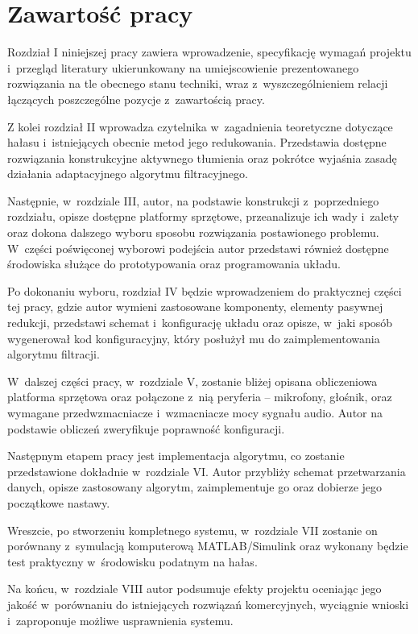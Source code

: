 \section{Zawartość pracy}
\label{sec:zawartoscPracy}
Rozdział I niniejszej pracy zawiera wprowadzenie, specyfikację wymagań projektu i~przegląd literatury ukierunkowany na umiejscowienie prezentowanego rozwiązania na tle obecnego stanu techniki, wraz z~wyszczególnieniem relacji łączących poszczególne pozycje z~zawartością pracy.

Z kolei rozdział II wprowadza czytelnika w~zagadnienia teoretyczne dotyczące hałasu i~istniejących obecnie metod jego redukowania. Przedstawia dostępne rozwiązania konstrukcyjne aktywnego tłumienia oraz pokrótce wyjaśnia zasadę działania adaptacyjnego algorytmu filtracyjnego.

Następnie, w~rozdziale III, autor, na podstawie konstrukcji z~poprzedniego rozdziału, opisze dostępne platformy sprzętowe, przeanalizuje ich wady i~zalety oraz dokona dalszego wyboru sposobu rozwiązania postawionego problemu. W~części poświęconej wyborowi podejścia autor przedstawi również dostępne środowiska służące do prototypowania oraz programowania układu.

Po dokonaniu wyboru, rozdział IV będzie wprowadzeniem do praktycznej części tej pracy, gdzie autor wymieni zastosowane komponenty, elementy pasywnej redukcji, przedstawi schemat i~konfigurację układu oraz opisze, w~jaki sposób wygenerował kod konfiguracyjny, który posłużył mu do zaimplementowania algorytmu filtracji.

W~dalszej części pracy, w~rozdziale V, zostanie bliżej opisana obliczeniowa platforma sprzętowa oraz połączone z~nią peryferia -- mikrofony, głośnik, oraz wymagane przedwzmacniacze i~wzmacniacze mocy sygnału audio. Autor na podstawie obliczeń zweryfikuje poprawność konfiguracji.

Następnym etapem pracy jest implementacja algorytmu, co zostanie przedstawione dokładnie w~rozdziale VI. Autor przybliży schemat przetwarzania danych, opisze zastosowany algorytm, zaimplementuje go oraz dobierze jego początkowe nastawy.

Wreszcie, po stworzeniu kompletnego systemu, w~rozdziale VII zostanie on porównany z~symulacją komputerową MATLAB/Simulink oraz wykonany będzie test praktyczny w~środowisku podatnym na hałas.

Na końcu, w~rozdziale VIII autor podsumuje efekty projektu oceniając jego jakość w~porównaniu do istniejących rozwiązań komercyjnych, wyciągnie wnioski i~zaproponuje możliwe usprawnienia systemu.
